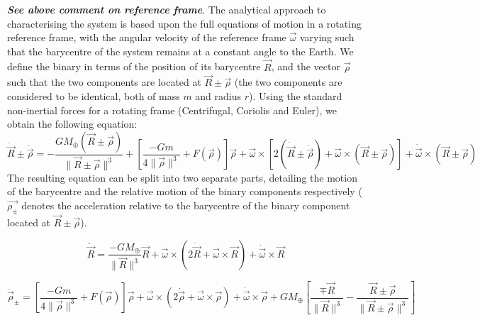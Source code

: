\documentclass[letterpaper, preprint, paper,11pt]{AAS}	%
\begin{document}
\textbf{\emph{See above comment on reference frame}}. The analytical approach to characterising the system is based upon the full equations of motion in a rotating reference frame, with the angular velocity of the reference frame $\vec{\omega}$ varying such that the barycentre of the system remains at a constant angle to the Earth. We define the binary in terms of the position of its barycentre $\vec{R}$, and the vector $\vec{\rho}$ such that the two components are located at $\vec{R}\pm\vec{\rho}$ (the two components are considered to be identical, both of mass $m$ and radius $r$). Using the standard non-inertial forces for a rotating frame (Centrifugal, Coriolis and Euler), we obtain the following equation:
\begin{equation}
\ddot{\vec{R}}\pm\ddot{\vec{\rho}} = -\frac{GM_\oplus(\vec{R}\pm\vec{\rho})}{\|\vec{R}\pm\vec{\rho}\|^{3}} + \left[\frac{-Gm}{4\|\vec{\rho}\|^{3}}+F(\vec{\rho})\right]\vec{\rho} +  \vec{\omega}\times[2(\dot{\vec{R}}\pm\dot{\vec{\rho}}) + \vec{\omega}\times(\vec{R}\pm\vec{\rho})]+\dot{\vec{\omega}}\times(\vec{R}\pm\vec{\rho}) 
\end{equation}
The resulting equation can be split into two separate parts, detailing the motion of the barycentre and the relative motion of the binary components respectively ($\vec{\rho_{\pm}}$ denotes the acceleration relative to the barycentre of the binary component located at $\vec{R}\pm\vec{\rho}$).
 
\begin{equation}
\ddot{\vec{R}} = \frac{-GM_\oplus}{\|\vec{R}\|^{3}}\vec{R}+\vec{\omega}\times(2\dot{\vec{R}}+\vec{\omega}\times\vec{R})+\dot{\vec{\omega}}\times\vec{R}
\end{equation}

\begin{equation}
\ddot{\vec{\rho}}_{\pm} = \left[\frac{-Gm}{4\|\vec{\rho}\|^{3}}+F(\vec{\rho})\right]\vec{\rho}+\vec{\omega}\times(2\dot{\vec{\rho}}+\vec{\omega}\times\vec{\rho})+\dot{\vec{\omega}}\times\vec{\rho}+{GM_\oplus}\left[\frac{\mp\vec{R}}{\|\vec{R}\|^{3}}-\frac{\vec{R}\pm\vec{\rho}}{\|\vec{R}\pm\vec{\rho}\|^{3}}\right]
\end{equation}
\end{document}
